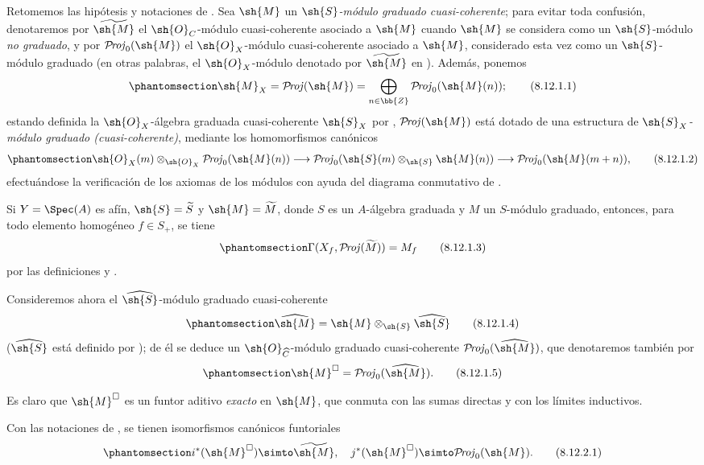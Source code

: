 \documentclass[oneside,10pt]{amsart}
\makeatletter
\newcommand{\ega@arrow}[2]{\mathchoice{#1}{#2}{#2}{#2}}
\renewcommand{\to}{\ega@arrow{\longrightarrow}{\rightarrow}}
\def\shProj{\mathcal{P}\!\mathit{roj}}
\newcommand{\oldpage}[2][]{\marginnote{\normalfont\footnotesize\textbf{#1}~|~#2}\ignorespaces}
\let\EGAOriginalLabel\label
\renewcommand{\label}[1]{\phantomsection\EGAOriginalLabel{#1}}
\makeatother
\begin{document}
\begin{env}[8.12.1]
\label{II.8.12.1}
Retomemos las hipótesis y notaciones de .
Sea $\sh{M}$ un \emph{$\sh{S}$-módulo graduado cuasi-coherente}; para evitar toda confusión, denotaremos por $\widetilde{\sh{M}}$ el $\sh{O}_C$-módulo cuasi-coherente
\oldpage[II]{192}
asociado a $\sh{M}$  cuando $\sh{M}$ se considera como un $\sh{S}$-módulo \emph{no graduado}, y por $\shProj_0(\sh{M})$ el $\sh{O}_X$-módulo cuasi-coherente asociado a $\sh{M}$, considerado esta vez como un $\sh{S}$-módulo graduado (en otras palabras, el $\sh{O}_X$-módulo denotado por $\widetilde{\sh{M}}$ en ).
Además, ponemos
\[
\label{II.8.12.1.1}
  \sh{M}_X=\shProj(\sh{M})=\bigoplus_{n\in\bb{Z}}\shProj_0(\sh{M}(n));
\tag{8.12.1.1}
\]
estando definida la $\sh{O}_X$-álgebra graduada cuasi-coherente $\sh{S}_X$ por , $\shProj(\sh{M})$ está dotado de una estructura de \emph{$\sh{S}_X$-módulo graduado (cuasi-coherente)}, mediante los homomorfismos canónicos 
\[
\label{II.8.12.1.2}
  \sh{O}_X(m)\otimes_{\sh{O}_X}\shProj_0(\sh{M}(n))\to\shProj_0(\sh{S}(m)\otimes_\sh{S}\sh{M}(n))\to\shProj_0(\sh{M}(m+n)),
\tag{8.12.1.2}
\]
efectuándose la verificación de los axiomas de los módulos con ayuda del diagrama conmutativo de .

Si $Y=\Spec(A)$ es afín, $\sh{S}=\widetilde{S}$ y $\sh{M}=\widetilde{M}$, donde $S$ es un $A$-álgebra graduada y $M$ un $S$-módulo graduado, entonces, para todo elemento homogéneo $f\in S_+$, se tiene
\[
\label{II.8.12.1.3}
  \Gamma(X_f,\shProj(\widetilde{M}))=M_f
\tag{8.12.1.3}
\]
por las definiciones y .

Consideremos ahora el $\widehat{\sh{S}}$-módulo graduado cuasi-coherente
\[
\label{II.8.12.1.4}
  \widehat{\sh{M}}=\sh{M}\otimes_\sh{S}\widehat{\sh{S}}
\tag{8.12.1.4}
\]
($\widehat{\sh{S}}$ está definido por ); de él se deduce un $\sh{O}_{\widehat{C}}$-módulo graduado cuasi-coherente $\shProj_0(\widehat{\sh{M}})$, que denotaremos también por
\[
\label{II.8.12.1.5}
  \sh{M}^\square=\shProj_0(\widehat{\sh{M}}).
\tag{8.12.1.5}
\]

Es claro  que $\sh{M}^\square$ es un funtor aditivo \emph{exacto} en $\sh{M}$, que conmuta con las sumas directas y con los límites inductivos.
\end{env}

\begin{proposition}[8.12.2]
\label{II.8.12.2}
Con las notaciones de , se tienen isomorfismos canónicos funtoriales
\[
\label{II.8.12.2.1}
    i^*(\sh{M}^\square)\simto\widetilde{\sh{M}},
    \quad
    j^*(\sh{M}^\square)\simto\shProj_0(\sh{M}).
\tag{8.12.2.1}
\]
\end{proposition}
\end{document}
